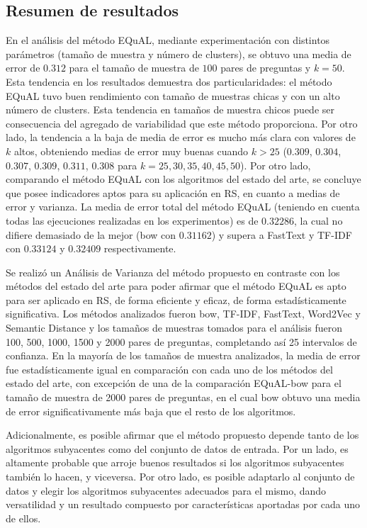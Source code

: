 \subsection{Resumen de resultados}

En el análisis del método EQuAL, mediante experimentación con distintos parámetros (tamaño de muestra y número de clusters), se obtuvo una media de error de \(0.312\) para el tamaño de muestra de \(100\) pares de preguntas y \(k = 50\). Esta tendencia en los resultados demuestra dos particularidades: el método EQuAL tuvo buen rendimiento con tamaño de muestras chicas y con un alto número de clusters. Esta tendencia en tamaños de muestra chicos puede ser consecuencia del agregado de variabilidad que este método proporciona. Por otro lado, la tendencia a la baja de media de error es mucho más clara con valores de \(k\) altos, obteniendo medias de error muy buenas cuando \(k > 25\) (\(0.309\), \(0.304\), \(0.307\), \(0.309\), \(0.311\), \(0.308\) para \(k = 25, 30, 35, 40, 45, 50\)). Por otro lado, comparando el método EQuAL con los algoritmos del estado del arte, se concluye que posee indicadores aptos para su aplicación en RS, en cuanto a medias de error y varianza. La media de error total del método EQuAL (teniendo en cuenta todas las ejecuciones realizadas en los experimentos) es de \(0.32286\), la cual no difiere demasiado de la mejor (bow con \(0.31162\)) y supera a FastText y TF-IDF con \(0.33124\) y \(0.32409\) respectivamente.

\bigskip Se realizó un Análisis de Varianza del método propuesto en contraste con los métodos del estado del arte para poder afirmar que el método EQuAL es apto para ser aplicado en RS, de forma eficiente y eficaz, de forma estadísticamente significativa. Los métodos analizados fueron bow, TF-IDF, FastText, Word2Vec y Semantic Distance y los tamaños de muestras tomados para el análisis fueron 100, 500, 1000, 1500 y 2000 pares de preguntas, completando así 25 intervalos de confianza. En la mayoría de los tamaños de muestra analizados, la media de error fue estadísticamente igual en comparación con cada uno de los métodos del estado del arte, con excepción de una de la comparación EQuAL-bow para el tamaño de muestra de 2000 pares de preguntas, en el cual bow obtuvo una media de error significativamente más baja que el resto de los algoritmos.

\bigskip Adicionalmente, es posible afirmar que el método propuesto depende tanto de los algoritmos subyacentes como del conjunto de datos de entrada. Por un lado, es altamente probable que arroje buenos resultados si los algoritmos subyacentes también lo hacen, y viceversa. Por otro lado, es posible adaptarlo al conjunto de datos y elegir los algoritmos subyacentes adecuados para el mismo, dando versatilidad y un resultado compuesto por características aportadas por cada uno de ellos.

